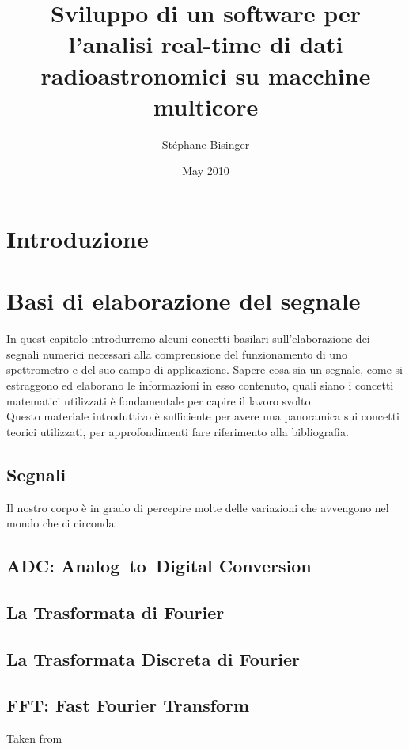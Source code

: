 \documentclass[a4paper,11pt,twoside,openright]{unibo}
\begin{document}
\title{Sviluppo di un software per l'analisi real-time di dati
radioastronomici su macchine multicore}
\author{St\'ephane Bisinger}
\date{May 2010}

\maketitle
%

\tableofcontents

\chapter*{Introduzione}
\label{intro}
\chapter{Basi di elaborazione del segnale}
\label{math_bkg}
In quest capitolo introdurremo alcuni concetti basilari sull'elaborazione dei
segnali numerici necessari alla comprensione del funzionamento di uno
spettrometro e del suo campo di applicazione. Sapere cosa sia un segnale, come
si estraggono ed elaborano le informazioni in esso contenuto, quali siano i
concetti matematici utilizzati è fondamentale per capire il lavoro svolto.\\
Questo materiale introduttivo è sufficiente per avere una panoramica sui
concetti teorici utilizzati, per approfondimenti fare riferimento alla
bibliografia.
\section{Segnali}
Il nostro corpo è in grado di percepire molte delle variazioni che avvengono nel mondo che ci circonda: 
\section{ADC: Analog--to--Digital Conversion}
\section{La Trasformata di Fourier}
\section{La Trasformata Discreta di Fourier}
\section{FFT: Fast Fourier Transform}
Taken from \cite{bertoni}
\end{document}

